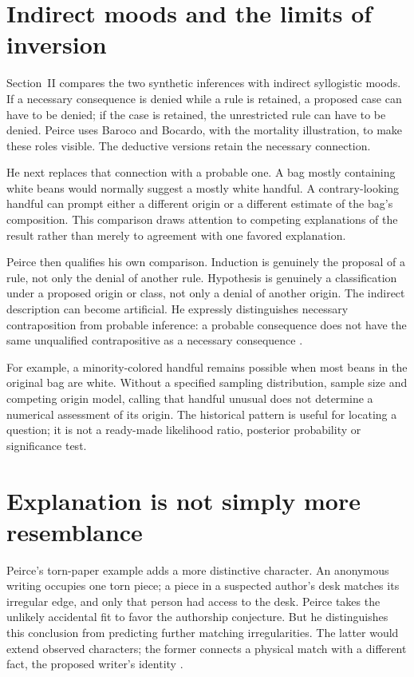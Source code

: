 \section{Indirect moods and the limits of inversion}
\label{sec:p16-peirce-indirect}

Section~II compares the two synthetic inferences with indirect
syllogistic moods. If a necessary consequence is denied while a rule
is retained, a proposed case can have to be denied; if the case is
retained, the unrestricted rule can have to be denied. Peirce uses
Baroco and Bocardo, with the mortality illustration, to make these
roles visible. The deductive versions retain the necessary connection.

He next replaces that connection with a probable one. A bag mostly
containing white beans would normally suggest a mostly white handful.
A contrary-looking handful can prompt either a different origin or a
different estimate of the bag's composition. This comparison draws
attention to competing explanations of the result rather than merely
to agreement with one favored explanation.

Peirce then qualifies his own comparison. Induction is genuinely the
proposal of a rule, not only the denial of another rule. Hypothesis is
genuinely a classification under a proposed origin or class, not only
a denial of another origin. The indirect description can become
artificial. He expressly distinguishes necessary contraposition from
probable inference: a probable consequence does not have the same
unqualified contrapositive as a necessary consequence
\parencite[sec.~II]{Peirce1878DIHPrimary}.

For example, a minority-colored handful remains possible when most beans
in the original bag are white. Without a specified sampling distribution,
sample size and competing origin model, calling that handful unusual
does not determine a numerical assessment of its origin. The historical
pattern is useful for locating a question; it is not a ready-made
likelihood ratio, posterior probability or significance test.

\section{Explanation is not simply more resemblance}
\label{sec:p16-peirce-resemblance}

Peirce's torn-paper example adds a more distinctive character. An
anonymous writing occupies one torn piece; a piece in a suspected
author's desk matches its irregular edge, and only that person had
access to the desk. Peirce takes the unlikely accidental fit to favor
the authorship conjecture. But he distinguishes this conclusion from
predicting further matching irregularities. The latter would extend
observed characters; the former connects a physical match with a
different fact, the proposed writer's identity
\parencite[sec.~III]{Peirce1878DIHPrimary}.

